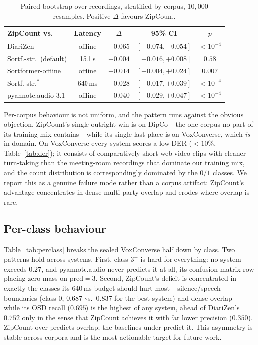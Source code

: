 \documentclass[journal]{IEEEtran}
\newcommand{\sys}{ZipCount}
\begin{document}
\begin{table}[t]
\centering
\caption{Paired bootstrap over recordings, stratified by corpus,
$10{,}000$ resamples. Positive $\Delta$ favours \sys{}.}
\label{tab:boot}
\footnotesize
\setlength{\tabcolsep}{3pt}
\begin{tabular}{lcccc}
\toprule
\sys{} vs. & Latency & $\Delta$ & 95\% CI & $p$ \\
\midrule
DiariZen                & offline    & $-0.065$ & $[-0.074,-0.054]$ & $<10^{-4}$ \\
Sortf.-str.\ (default)  & 15.1\,s    & $-0.004$ & $[-0.016,+0.008]$ & $0.58$ \\
Sortformer-offline      & offline    & $+0.014$ & $[+0.004,+0.024]$ & $0.007$ \\
Sortf.-str.$^{*}$       & 640\,ms    & $+0.028$ & $[+0.017,+0.039]$ & $<10^{-4}$ \\
pyannote.audio 3.1      & offline    & $+0.040$ & $[+0.029,+0.047]$ & $<10^{-4}$ \\
\bottomrule
\end{tabular}
\end{table}

Per-corpus behaviour is not uniform, and the pattern runs against the
obvious objection. \sys{}'s single outright win is on DipCo -- the one
corpus no part of its training mix contains -- while its single last place
is on VoxConverse, which \emph{is} in-domain. On VoxConverse every system
scores a low DER ($<\!10\%$, Table~\ref{tab:der}); it consists of
comparatively short web-video clips with cleaner turn-taking than the
meeting-room recordings that dominate our training mix, and the count
distribution is correspondingly dominated by the $0$/$1$ classes. We report
this as a genuine failure mode rather than a corpus artifact: \sys{}'s
advantage concentrates in dense multi-party overlap and erodes where overlap
is rare.

\subsection{Per-class behaviour}
Table~\ref{tab:perclass} breaks the sealed VoxConverse half down by class.
Two patterns hold across systems. First, class $3^{+}$ is hard for
everything: no system exceeds $0.27$, and pyannote.audio never predicts it
at all, its confusion-matrix row placing zero mass on $\mathrm{pred}\!=\!3$.
Second, \sys{}'s deficit is concentrated in exactly the classes its
$640$\,ms budget should hurt most -- silence/speech boundaries (class $0$,
$0.687$ vs.\ $0.837$ for the best system) and dense overlap -- while its OSD
recall ($0.695$) is the highest of any system, ahead of DiariZen's $0.752$
only in the sense that \sys{} achieves it with far lower precision
($0.350$). \sys{} over-predicts overlap; the baselines under-predict it.
This asymmetry is stable across corpora and is the most actionable target
for future work.
\end{document}
